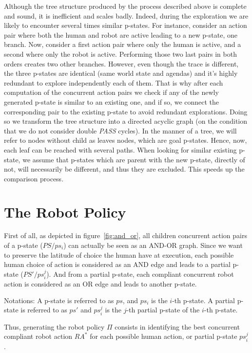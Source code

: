 Although the tree structure produced by the process described above is complete and sound, it is inefficient and scales badly. Indeed, during the exploration we are likely to encounter several times similar p-states. For instance, consider an action pair where both the human and robot are active leading to a new p-state, one branch. Now, consider a first action pair where only the human is active, and a second where only the robot is active. Performing those two last pairs in both orders creates two other branches. However, even though the trace is different, the three p-states are identical (same world state and agendas) and it's highly redundant to explore independently each of them. That is why after each computation of the concurrent action pairs we check if any of the newly generated p-state is similar to an existing one, and if so, we connect the corresponding pair to the existing p-state to avoid redundant explorations. Doing so we transform the tree structure into a directed acyclic graph (on the condition that we do not consider double \textit{PASS} cycles). In the manner of a tree, we will refer to nodes without child as leaves nodes, which are goal p-states. Hence, now, each leaf can be reached with several paths. 
When looking for similar existing p-state, we assume that p-states which are parent with the new p-state, directly of not, will necessarily be different, and thus they are excluded. This speeds up the comparison process. 

\section{The Robot Policy}

First of all, as depicted in figure~\ref{fig:and_or}, all children concurrent action pairs of a p-state ($PS / ps_i$) can actually be seen as an AND-OR graph. Since we want to preserve the latitude of choice the human have at execution, each possible human choice of action is considered as an AND edge and leads to a partial p-state ($PS' / ps_i^j$). And from a partial p-state, each compliant concurrent robot action is considered as an OR edge and leads to another p-state.

Notations: A p-state is referred to as $ps$, and $ps_i$ is the $i$-th p-state. A partial p-state is referred to as $ps'$ and $ps_i^j$ is the $j$-th partial p-state of the $i$-th p-state.

Thus, generating the robot policy $\Pi$ consists in identifying the best concurrent compliant robot action $RA^*$ for each possible human action, or partial p-state $ps_i^j$.

